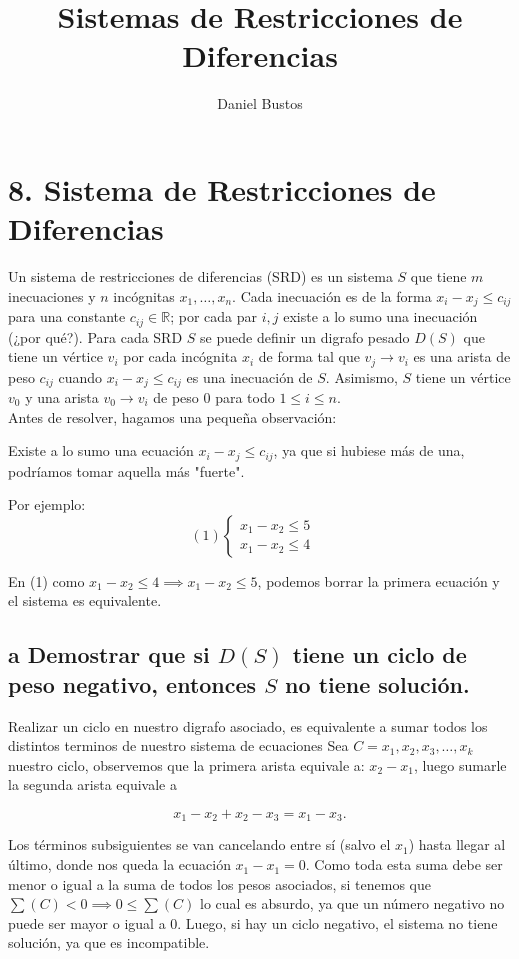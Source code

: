 \documentclass{article}
\title{Sistemas de Restricciones de Diferencias}
\author{Daniel Bustos}
\date{}
\begin{document}
\maketitle

\section*{8. Sistema de Restricciones de Diferencias}

Un sistema de restricciones de diferencias (SRD) es un sistema $S$ que tiene $m$ inecuaciones y $n$ incógnitas $x_1, \ldots, x_n$. Cada inecuación es de la forma $x_i - x_j \leq c_{ij}$ para una constante $c_{ij} \in \mathbb{R}$; por cada par $i, j$ existe a lo sumo una inecuación (¿por qué?). Para cada SRD $S$ se puede definir un digrafo pesado $D(S)$ que tiene un vértice $v_i$ por cada incógnita $x_i$ de forma tal que $v_j \to v_i$ es una arista de peso $c_{ij}$ cuando $x_i - x_j \leq  c_{ij}$ es una inecuación de $S$. Asimismo, $S$ tiene un vértice $v_0$ y una arista $v_0 \to v_i$ de peso 0 para todo $1 \leq i \leq n$.\\

Antes de resolver, hagamos una pequeña observación:

Existe a lo sumo una ecuación $x_i - x_j \leq c_{ij}$, ya que si hubiese más de una, podríamos tomar aquella más "fuerte".

Por ejemplo:
\[
(1)
\begin{cases}
    x_1 - x_2 \leq 5 \\
    x_1 - x_2 \leq 4
\end{cases}
\quad
\]

En (1) como $x_1 - x_2 \leq 4 \implies x_1 - x_2 \leq 5$, podemos borrar la primera ecuación y el sistema es equivalente. 
\subsection*{a Demostrar que si $D(S)$ tiene un ciclo de peso negativo, entonces $S$ no tiene solución.}
Realizar un ciclo en nuestro digrafo asociado, es equivalente a sumar todos los distintos terminos de nuestro sistema de ecuaciones
Sea $C = x_1, x_2, x_3, \ldots, x_k$ nuestro ciclo, observemos que la primera arista equivale a: $x_2 - x_1$, luego sumarle la segunda arista equivale a 

\[
x_1 - x_2 + x_2 - x_3 = x_1 - x_3.
\]

Los términos subsiguientes se van cancelando entre sí (salvo el $x_1$) hasta llegar al último, donde nos queda la ecuación $x_1 - x_1 = 0$. Como toda esta suma debe ser menor o igual a la suma de todos los pesos asociados, si tenemos que $\sum(C) < 0 \implies 0 \leq \sum(C)$ lo cual es absurdo, ya que un número negativo no puede ser mayor o igual a 0. Luego, si hay un ciclo negativo, el sistema no tiene solución, ya que es incompatible.
\end{document}
